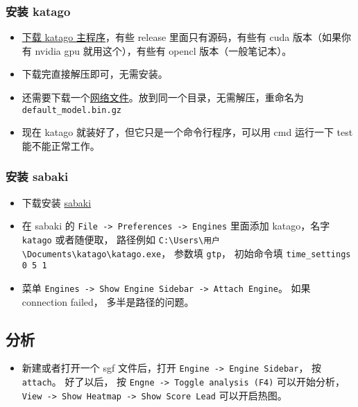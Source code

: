 
\begin{issues}
\issueDraft
\end{issues}

\subsubsection{安装 katago}
\begin{itemize}
\item \href{https://github.com/lightvector/KataGo/releases}{下载 katago 主程序}，有些 release 里面只有源码，有些有 cuda 版本（如果你有 nvidia gpu 就用这个），有些有 opencl 版本（一般笔记本）。
\item 下载完直接解压即可，无需安装。
\item 还需要下载一个\href{https://katagotraining.org/networks/}{网络文件}。放到同一个目录，无需解压，重命名为 \verb|default_model.bin.gz|
\item 现在 katago 就装好了，但它只是一个命令行程序，可以用 cmd 运行一下 test 能不能正常工作。
\end{itemize}

\subsubsection{安装 sabaki}
\begin{itemize}
\item 下载安装 \href{https://sabaki.yichuanshen.de/}{sabaki}
\item 在 sabaki 的 \verb|File -> Preferences -> Engines| 里面添加 katago，名字 \verb|katago| 或者随便取， 路径例如 \verb|C:\Users\用户\Documents\katago\katago.exe|， 参数填 \verb|gtp|， 初始命令填 \verb|time_settings 0 5 1|
\item 菜单 \verb|Engines -> Show Engine Sidebar -> Attach Engine|。 如果 connection failed， 多半是路径的问题。
\end{itemize}

\subsection{分析}
\begin{itemize}
\item 新建或者打开一个 sgf 文件后，打开 \verb|Engine -> Engine Sidebar|， 按 \verb|attach|。 好了以后， 按 \verb|Engne -> Toggle analysis (F4)| 可以开始分析， \verb|View -> Show Heatmap -> Show Score Lead| 可以开启热图。
\end{itemize}
